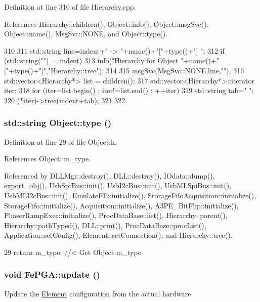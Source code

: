 Definition at line 310 of file Hierarchy.cpp.

References Hierarchy::children(), Object::info(), Object::msgSvc(), Object::name(), MsgSvc::NONE, and Object::type().


\begin{DoxyCode}
310                                     {
311   std::string line=indent+" -> "+name()+"["+type()+"] ";
312   if (std::string("")==indent){
313     info("Hierarchy for Object "+name()+"["+type()+"]","Hierarchy::tree");
314   }
315   msgSvc(MsgSvc::NONE,line,"");
316   std::vector<Hierarchy*> list = children();
317   std::vector<Hierarchy*>::iterator iter;
318   for (iter=list.begin() ; iter!=list.end() ; ++iter){
319     std::string tab="  ";
320     (*iter)->tree(indent+tab);
321   }
322 }
\end{DoxyCode}
\hypertarget{classObject_a84f99f70f144a83e1582d1d0f84e4e62}{
\subsubsection[{type}]{\setlength{\rightskip}{0pt plus 5cm}std::string Object::type ()}}
\label{classObject_a84f99f70f144a83e1582d1d0f84e4e62}


Definition at line 29 of file Object.h.

References Object::m\_\-type.

Referenced by DLLMgr::destroy(), DLL::destroy(), IOdata::dump(), export\_\-obj(), UsbSpiBus::init(), UsbI2cBus::init(), UsbMLSpiBus::init(), UsbMLI2cBus::init(), EmulateFE::initialize(), StorageFifoAcquisition::initialize(), StorageFifo::initialize(), Acquisition::initialize(), A3PE\_\-BitFlip::initialize(), PhaserRampExec::initialize(), ProcDataBase::list(), Hierarchy::parent(), Hierarchy::pathTyped(), DLL::print(), ProcDataBase::procList(), Application::setConfig(), Element::setConnection(), and Hierarchy::tree().


\begin{DoxyCode}
29 { return m_type;       } //< Get Object m_type
\end{DoxyCode}
\hypertarget{classFePGA_ad23605ae261d2aa0562cbb732661b2c4}{
\subsubsection[{update}]{\setlength{\rightskip}{0pt plus 5cm}void FePGA::update ()}}
\label{classFePGA_ad23605ae261d2aa0562cbb732661b2c4}
Update the \hyperlink{classElement}{Element} configuration from the actual hardware 

